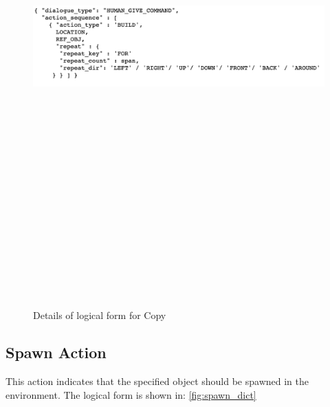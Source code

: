 \begin{figure}[h]
    \centering
    \includegraphics[width=15cm,height=20cm,keepaspectratio]{figures/copy.png}
    \caption{Details of logical form for Copy}
    \label{fig:copy_dict}
\end{figure}

\subsection{ Spawn Action}
This action indicates that the specified object should be spawned in the environment. The logical form is shown in: \ref{fig:spawn_dict}

